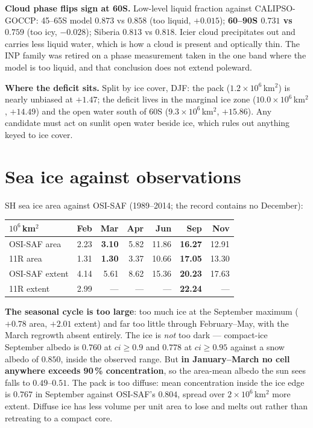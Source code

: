 \documentclass[10pt]{article}
\begin{document}
\textbf{Cloud phase flips sign at 60S.} Low-level liquid fraction against CALIPSO-GOCCP:
45--65S model $0.873$ vs $0.858$ (too liquid, $+0.015$); \textbf{60--90S $0.731$ vs
$0.759$} (too icy, $-0.028$); Siberia $0.813$ vs $0.818$. Icier cloud precipitates out and
carries less liquid water, which is how a cloud is present and optically thin. The INP
family was retired on a phase measurement taken in the one band where the model is too
liquid, and that conclusion does not extend poleward.

\textbf{Where the deficit sits.} Split by ice cover, DJF: the pack ($1.2\times10^6$\,km$^2$)
is nearly unbiased at $+1.47$; the deficit lives in the marginal ice zone
($10.0\times10^6$\,km$^2$, $+14.49$) and the open water south of 60S
($9.3\times10^6$\,km$^2$, $+15.86$). Any candidate must act on sunlit open water beside
ice, which rules out anything keyed to ice cover.

\section{Sea ice against observations}\label{sec:ice}
SH sea ice area against OSI-SAF (1989--2014; the record contains no December):

\begin{center}\small
\begin{tabular}{lrrrrrr}
\toprule
$10^6$\,km$^2$ & Feb & Mar & Apr & Jun & Sep & Nov \\
\midrule
OSI-SAF area & 2.23 & \textbf{3.10} & 5.82 & 11.86 & \textbf{16.27} & 12.91 \\
11R area & 1.31 & \textbf{1.30} & 3.37 & 10.66 & \textbf{17.05} & 13.30 \\
OSI-SAF extent & 4.14 & 5.61 & 8.62 & 15.36 & \textbf{20.23} & 17.63 \\
11R extent & 2.99 & --- & --- & --- & \textbf{22.24} & --- \\
\bottomrule
\end{tabular}
\end{center}

\textbf{The seasonal cycle is too large}: too much ice at the September maximum ($+0.78$
area, $+2.01$ extent) and far too little through February--May, with the March regrowth
absent entirely. The ice is \emph{not} too dark --- compact-ice September albedo is $0.760$
at $ci\ge0.9$ and $0.778$ at $ci\ge0.95$ against a snow albedo of $0.850$, inside the
observed range. But \textbf{in January--March no cell anywhere exceeds 90\,\%
concentration}, so the area-mean albedo the sun sees falls to $0.49$--$0.51$. The pack is
too diffuse: mean concentration inside the ice edge is $0.767$ in September against
OSI-SAF's $0.804$, spread over $2\times10^6$\,km$^2$ more extent. Diffuse ice has less
volume per unit area to lose and melts out rather than retreating to a compact core.
\end{document}
